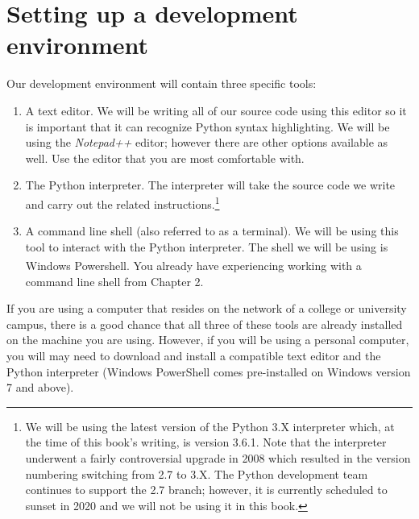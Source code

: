\documentclass{book}
\begin{document}
\section{Setting up a development environment}
Our development environment will contain three specific tools:
\begin{enumerate}
	\item A text editor. We will be writing all of our source code using this editor so it is important that it can recognize Python syntax highlighting. We will be using the \textit{Notepad++} editor; however there are other options available as well. Use the editor that you are most comfortable with. 
	\item The Python interpreter. The interpreter will take the source code we write and carry out the related instructions.\footnote{We will be using the latest version of the Python 3.X interpreter which, at the time of this book's writing, is version 3.6.1. Note that the interpreter underwent a fairly controversial upgrade in 2008 which resulted in the version numbering switching from 2.7 to 3.X. The Python development team continues to support the 2.7 branch; however, it is currently scheduled to sunset in 2020 and we will not be using it in this book.}
	\item A command line shell (also referred to as a terminal). We will be using this tool to interact with the Python interpreter. The shell we will be using is Windows Powershell\textsuperscript{\textregistered}. You already have experiencing working with a command line shell from Chapter 2.
\end{enumerate}

If you are using a computer that resides on the network of a college or university campus, there is a good chance that all three of these tools are already installed on the machine you are using. However, if you will be using a personal computer, you will may need to download and install a compatible text editor and the Python interpreter (Windows PowerShell comes pre-installed on Windows version 7 and above).
\end{document}
